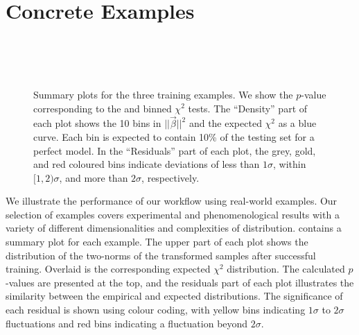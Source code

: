 \documentclass[aps,nofootinbib,superscriptaddress,reprint,preprintnumbers]{revtex4-1}
\newcommand{\pvalue}{$p$-value\xspace}
\newcommand{\pvalues}{$p$-values\xspace}
\begin{document}
\section{Concrete Examples}

\begin{figure}
    \\
    \\
    \\
    \caption{
        Summary plots for the three training examples.
        We show the \pvalue corresponding to the \KS and binned $\chi^2$ tests.
        The ``Density'' part of each plot shows the 10 bins in $||\vec\beta||^2$ and the expected $\chi^2$ \PDF as a blue curve.
        Each bin is expected to contain 10\% of the testing set for a perfect model.
        In the ``Residuals'' part of each plot, the grey, gold, and red coloured bins indicate deviations of less than $1\sigma$, within $[1,2)\sigma$, and more than $2\sigma$, respectively.
    }\label{fig:results}
\end{figure}

We illustrate the performance of our workflow using real-world examples. Our selection of examples
covers experimental and phenomenological results with a variety of different dimensionalities and complexities
of distribution.
 contains a summary plot for each example.
The upper part of each plot shows the distribution of the two-norms of the transformed samples after successful training.
Overlaid is the corresponding expected $\chi^2$ distribution.
The calculated \pvalues are presented at the top, and the residuals part of each plot illustrates the similarity between the empirical and expected distributions. The significance of each residual is shown using colour coding, with
yellow bins indicating $1\sigma$ to $2\sigma$ fluctuations and red bins indicating a fluctuation beyond $2\sigma$.
\end{document}
